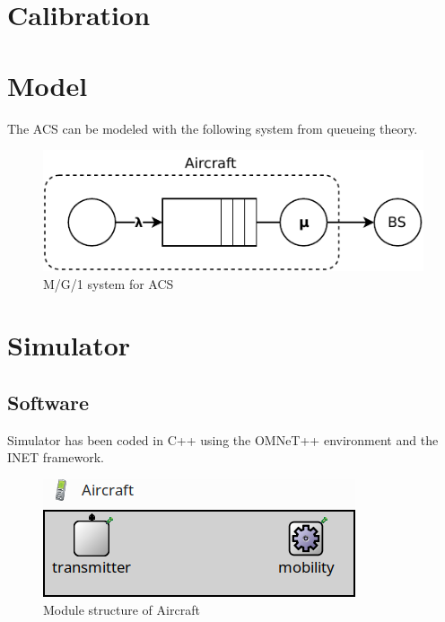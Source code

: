 \documentclass[a4paper,12pt]{article}
\begin{document}
\section{Calibration}




\section{Model}
The ACS can be modeled with the following system from queueing theory.

\begin{figure}[H]
  \centering
  \includegraphics{img/model.pdf}
  \caption{M/G/1 system for ACS}
  \label{fig:model}
\end{figure}

\section{Simulator}
\subsection{Software}
Simulator has been coded in C++ using the OMNeT++ environment and the INET framework.
\begin{figure}[H]
  \centering
  \includegraphics{img/aircraft-ned.png}
  \caption{Module structure of Aircraft}
  \label{fig:aircraft-ned}
\end{figure}
\end{document}
